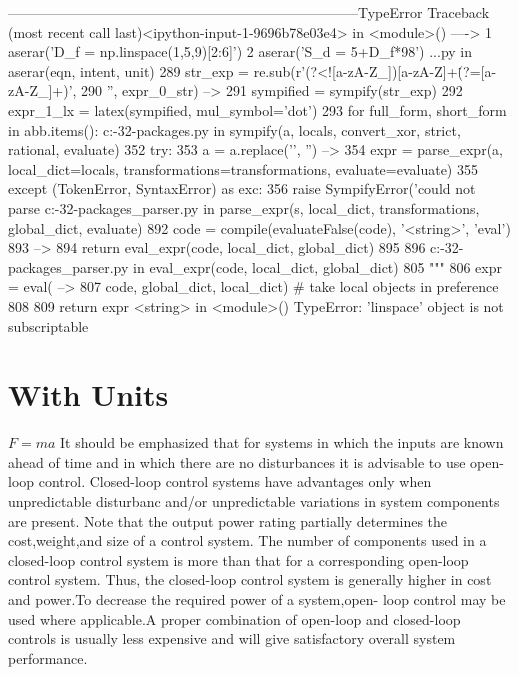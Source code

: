 \documentclass{report}
\begin{document}
---------------------------------------------------------------------------TypeError                                 Traceback (most recent call last)<ipython-input-1-9696b78e03e4> in <module>()
----> 1 aserar('D_f = np.linspace(1,5,9)[2:6]')
      2 aserar('S_d = 5+D_f*98')
..\scpycalc.py in aserar(eqn, intent, unit)
    289     str_exp = re.sub(r'(?<![a-zA-Z_])[a-zA-Z]+\.(?=[a-zA-Z_]+)',
    290                      '', expr_0_str)
--> 291     sympified = sympify(str_exp)
    292     expr_1_lx = latex(sympified, mul_symbol='dot')
    293     for full_form, short_form in abb.items():
c:\programs\python{}-32\lib\site-packages\sympy\core\sympify.py in sympify(a, locals, convert_xor, strict, rational, evaluate)
    352     try:
    353         a = a.replace('\n', '')
--> 354         expr = parse_expr(a, local_dict=locals, transformations=transformations, evaluate=evaluate)
    355     except (TokenError, SyntaxError) as exc:
    356         raise SympifyError('could not parse %
c:\programs\python{}-32\lib\site-packages\sympy\parsing\sympy_parser.py in parse_expr(s, local_dict, transformations, global_dict, evaluate)
    892         code = compile(evaluateFalse(code), '<string>', 'eval')
    893 
--> 894     return eval_expr(code, local_dict, global_dict)
    895 
    896 
c:\programs\python{}-32\lib\site-packages\sympy\parsing\sympy_parser.py in eval_expr(code, local_dict, global_dict)
    805     """
    806     expr = eval(
--> 807         code, global_dict, local_dict)  # take local objects in preference
    808 
    809     return expr
<string> in <module>()
TypeError: 'linspace' object is not subscriptable

\section{With Units}
$F = ma$ It should be emphasized that for systems in which the inputs are known ahead of time and in which there are no disturbances it is advisable to use open-loop control.  Closed-loop control systems have advantages only when unpredictable disturbanc  and/or unpredictable variations in system components are present. Note that the  output power rating partially determines the cost,weight,and size of a control system.  The number of components used in a closed-loop control system is more than that for  a corresponding open-loop control system. Thus, the closed-loop control system is generally higher in cost and power.To decrease the required power of a system,open-  loop control may be used where applicable.A proper combination of open-loop and  closed-loop controls is usually less expensive and will give satisfactory overall system  performance.
\end{document}
